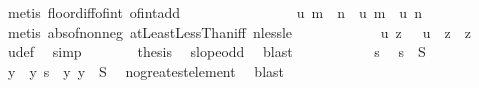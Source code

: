 \begin{isabellebody}
\ {\isacharparenleft}{\kern0pt}metis\ floor{\isacharunderscore}{\kern0pt}diff{\isacharunderscore}{\kern0pt}of{\isacharunderscore}{\kern0pt}int\ of{\isacharunderscore}{\kern0pt}int{\isacharunderscore}{\kern0pt}add{\isacharparenright}{\kern0pt}\isanewline
\ \ \ \ \ \ \isacommand{{\isacharbraceright}{\kern0pt}}\isamarkupfalse%
\isanewline
\ \ \ \ \ \ \isamarkupfalse%
\ \isamarkupfalse%
\ {\isachardoublequoteopen}{\isasymbar}u\ {\isacharparenleft}{\kern0pt}m\ {\isacharplus}{\kern0pt}\ n{\isacharparenright}{\kern0pt}\ {\isacharminus}{\kern0pt}\ {\isacharparenleft}{\kern0pt}u\ m\ {\isacharplus}{\kern0pt}\ u\ n{\isacharparenright}{\kern0pt}{\isasymbar}\ {\isasymle}\ {}{\isachardoublequoteclose}\ \isamarkupfalse%
\ {\isacharparenleft}{\kern0pt}metis\ abs{\isacharunderscore}{\kern0pt}of{\isacharunderscore}{\kern0pt}nonneg\ atLeastLessThan{\isacharunderscore}{\kern0pt}iff\ nless{\isacharunderscore}{\kern0pt}le{\isacharparenright}{\kern0pt}\isanewline
\ \ \ \ \isacommand{{\isacharbraceright}{\kern0pt}}\isamarkupfalse%
\isanewline
\ \ \ \ \isamarkupfalse%
\ \isamarkupfalse%
\ {\isachardoublequoteopen}u\ z\ {\isacharequal}{\kern0pt}\ {\isacharminus}{\kern0pt}\ u\ {\isacharparenleft}{\kern0pt}{\isacharminus}{\kern0pt}\ z{\isacharparenright}{\kern0pt}{\isachardoublequoteclose}\ \ z\ \isamarkupfalse%
\ u{\isacharunderscore}{\kern0pt}def\ \isamarkupfalse%
\ simp\isanewline
\ \ \ \ \isamarkupfalse%
\ \isamarkupfalse%
\ {\isacharquery}{\kern0pt}thesis\ \isamarkupfalse%
\ slope{\isacharunderscore}{\kern0pt}odd\ \isamarkupfalse%
\ blast\isanewline
\ \ \isamarkupfalse%
\isanewline
\ \ \isacommand{{\isacharbraceleft}{\kern0pt}}\isamarkupfalse%
\isanewline
\ \ \ \ \isamarkupfalse%
\ s\ \isamarkupfalse%
\ {\isachardoublequoteopen}s\ {\isasymin}\ S{\isachardoublequoteclose}\isanewline
\ \ \ \ \isamarkupfalse%
\ \isamarkupfalse%
\ y\ \ y{\isacharcolon}{\kern0pt}\ {\isachardoublequoteopen}s\ {\isacharless}{\kern0pt}\ y{\isachardoublequoteclose}\ {\isachardoublequoteopen}y\ {\isasymin}\ S{\isachardoublequoteclose}\ \isamarkupfalse%
\ no{\isacharunderscore}{\kern0pt}greatest{\isacharunderscore}{\kern0pt}element\ \isamarkupfalse%
\ blast\isanewline
\ \ \ \ \isamarkupfalse%
\ \isamarkupfalse%

\end{isabellebody}
